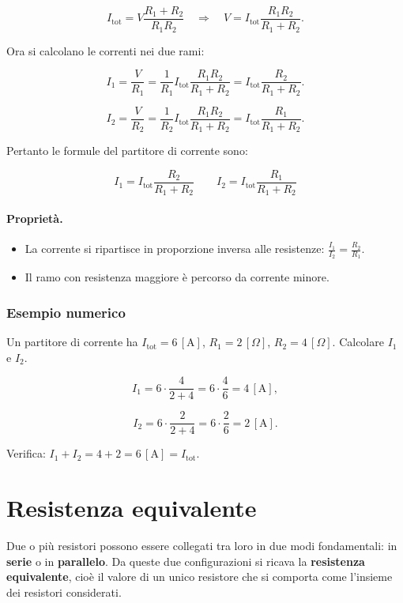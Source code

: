 \[
I_{\text{tot}} = V \frac{R_1 + R_2}{R_1 R_2} \quad\Longrightarrow\quad V = I_{\text{tot}} \frac{R_1 R_2}{R_1 + R_2}.
\]

Ora si calcolano le correnti nei due rami:

\[
I_1 = \frac{V}{R_1} = \frac{1}{R_1} I_{\text{tot}} \frac{R_1 R_2}{R_1 + R_2} = I_{\text{tot}} \frac{R_2}{R_1 + R_2}.
\]

\[
I_2 = \frac{V}{R_2} = \frac{1}{R_2} I_{\text{tot}} \frac{R_1 R_2}{R_1 + R_2} = I_{\text{tot}} \frac{R_1}{R_1 + R_2}.
\]

Pertanto le formule del partitore di corrente sono:

\[
\boxed{
I_1 = I_{\text{tot}} \frac{R_2}{R_1 + R_2}
}
\qquad
\boxed{
I_2 = I_{\text{tot}} \frac{R_1}{R_1 + R_2}
}
\]

\paragraph{Proprietà.}
\begin{itemize}[leftmargin=1cm]
  \item La corrente si ripartisce in proporzione inversa alle resistenze: \(\frac{I_1}{I_2} = \frac{R_2}{R_1}\).
  \item Il ramo con resistenza maggiore è percorso da corrente minore.
\end{itemize}

\subsubsection{Esempio numerico}

Un partitore di corrente ha \(I_{\text{tot}} = 6\,[\text{A}]\), \(R_1 = 2\,[\Omega]\), \(R_2 = 4\,[\Omega]\). Calcolare \(I_1\) e \(I_2\).

\[
I_1 = 6 \cdot \frac{4}{2+4} = 6 \cdot \frac{4}{6} = 4\,[\text{A}],
\]

\[
I_2 = 6 \cdot \frac{2}{2+4} = 6 \cdot \frac{2}{6} = 2\,[\text{A}].
\]

Verifica: \(I_1 + I_2 = 4 + 2 = 6\,[\text{A}] = I_{\text{tot}}\).

\section{Resistenza equivalente}

\begin{concetto}
Due o più resistori possono essere collegati tra loro in due modi fondamentali: in \textbf{serie} o in \textbf{parallelo}. Da queste due configurazioni si ricava la \textbf{resistenza equivalente}, cioè il valore di un unico resistore che si comporta come l'insieme dei resistori considerati.
\end{concetto}

